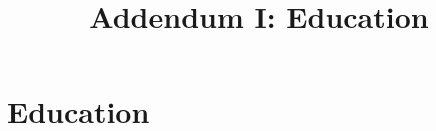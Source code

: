 \documentclass[11pt,a4paper,roman]{moderncv}
\title{Addendum I: Education}
\begin{document}
\maketitle




\section{Education}
\end{document}

